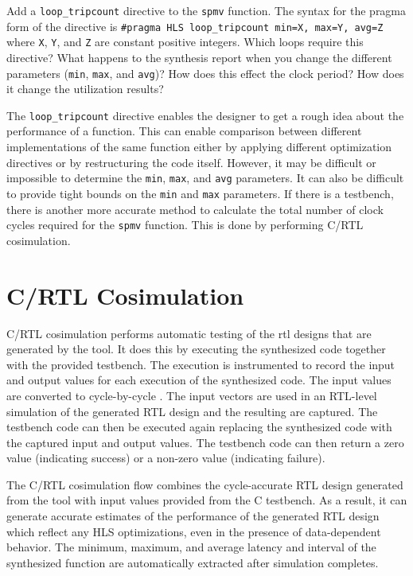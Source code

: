\begin{exercise}
Add a \lstinline{loop_tripcount} directive to the \lstinline{spmv} function. The syntax for the pragma form of the directive is \lstinline{#pragma HLS loop_tripcount min=X, max=Y, avg=Z} where \lstinline{X}, \lstinline{Y}, and \lstinline{Z} are constant positive integers. Which loops require this directive? What happens to the synthesis report when you change the different parameters (\lstinline{min}, \lstinline{max}, and \lstinline{avg})? How does this effect the clock period? How does it change the utilization results?
\end{exercise}

The \lstinline{loop_tripcount} directive enables the designer to get a rough idea about the performance of a function. This can enable comparison between different implementations of the same function either by applying different optimization directives or by restructuring the code itself.  However, it may be difficult or impossible to determine the \lstinline{min}, \lstinline{max}, and \lstinline{avg} parameters.  It can also be difficult to provide tight bounds on the \lstinline{min} and \lstinline{max} parameters. If there is a testbench, there is another more accurate method to calculate the total number of clock cycles required for the \lstinline{spmv} function. This is done by performing C/RTL cosimulation. 

\section{C/RTL Cosimulation}

C/RTL cosimulation performs automatic testing of the \gls{rtl} designs that are generated by the \VHLS tool. It does this by executing the synthesized code together with the provided testbench. The execution is instrumented to record the input and output values for each execution of the synthesized code. The input values are converted to cycle-by-cycle .  The input vectors are used in an RTL-level simulation of the generated RTL design and the resulting  are captured.  The testbench code can then be executed again replacing the synthesized code with the captured input and output values.  The testbench code can then return a zero value (indicating success) or a non-zero value (indicating failure).

The C/RTL cosimulation flow combines the cycle-accurate RTL design generated from the \VHLS tool with input values provided from the C testbench. As a result, it can generate accurate estimates of the performance of the generated RTL design which reflect any HLS optimizations, even in the presence of data-dependent behavior.  The minimum, maximum, and average latency and interval of the synthesized function are automatically extracted after simulation completes.

